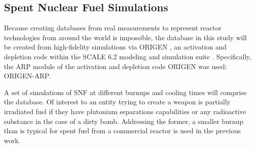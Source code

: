 \subsection{Spent Nuclear Fuel Simulations}
\label{sec:snfsim}

Because creating databases from real measurements to represent reactor
technologies from around the world is impossible, the database in this study
will be created from high-fidelity simulations via \gls{ORIGEN} \cite{origen},
an activation and depletion code within the SCALE 6.2 modeling and simulation
suite \cite{scale}. Specifically, the ARP module of the activation and
depletion code ORIGEN was used: \gls{ORIGEN-ARP}.

A set of simulations of \gls{SNF} at different burnups and cooling times will
comprise the database.  Of interest to an entity trying to create a weapon is
partially irradiated fuel if they have plutonium separations capabilities or
any radioactive substance in the case of a dirty bomb.  Addressing the former,
a smaller burnup than is typical for spent fuel from a commercial reactor is
used in the previous work.  

